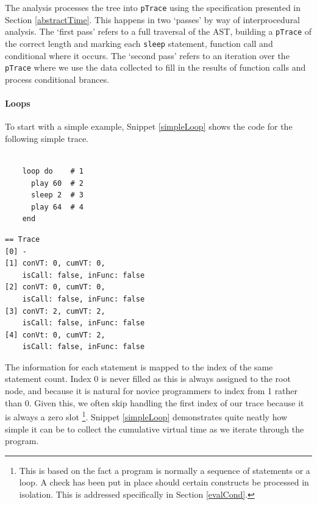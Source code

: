 \documentclass[11pt, abstracton, twoside, titlepage=true]{scrartcl}
\begin{document}
The analysis processes the tree into \texttt{pTrace} using the specification 
presented in Section \ref{abstractTime}. This happens in two `passes' by way of 
interprocedural analysis. The `first pass' refers to a full traversal of the AST, 
building a \texttt{pTrace} of the correct length and marking each \texttt{sleep} 
statement, function call and conditional where it occurs. The `second pass' refers 
to an iteration over the \texttt{pTrace} where we use the data collected to fill 
in the results of function calls and process conditional brances. 

\paragraph{Loops}
To start with a simple example, Snippet \ref{simpleLoop} shows the code for the
following simple trace.

\begin{multicols}{2}
	\begin{minipage}{0.4\textwidth}
		\begin{lstlisting}[style = sonicpi]

    loop do    # 1
      play 60  # 2
      sleep 2  # 3
      play 64  # 4
    end

		\end{lstlisting}
		 \label{simpleLoop}
	\end{minipage} \hspace{25pt}
	\begin{minipage}{0.4\textwidth}
	\begin{lstlisting}
== Trace
[0] -                 
[1] conVT: 0, cumVT: 0, 
    isCall: false, inFunc: false
[2] conVT: 0, cumVT: 0, 
    isCall: false, inFunc: false
[3] conVT: 2, cumVT: 2, 
    isCall: false, inFunc: false
[4] conVt: 0, cumVT: 2, 
    isCall: false, inFunc: false
	\end{lstlisting}
	\end{minipage}

\end{multicols}

The information for each statement is mapped to the index of the same statement 
count. Index 0 is never filled as this is always assigned to the root node, and 
because it is natural for novice programmers to index from 1 rather than 0. Given 
this, we often skip handling the first index of our trace because it is always a 
zero slot \footnote{This is based on the fact a program is normally a sequence of 
statements or a loop. A check has been put in place should certain constructs be 
processed in isolation. This is addressed specifically in Section \ref{evalCond}.}.
Snippet \ref{simpleLoop} demonstrates quite neatly how simple it can be to collect 
the cumulative virtual time as we iterate through the program.
\end{document}
